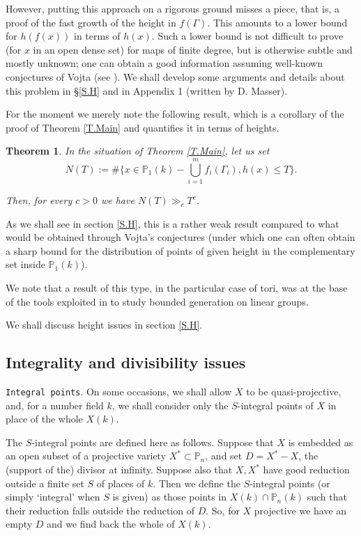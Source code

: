 \documentclass[leqno,12pt]{article} %
\def\P{{{\mathbb P}}}
\theoremstyle{plain} %
\newtheorem{theorem}{\indent\sc Theorem}[section]
\theoremstyle{definition} %
\begin{document}
 However, putting this approach on a rigorous ground misses a piece, that is, a proof of the fast growth of the height in $f(\Gamma)$. This amounts to a lower bound  for $h(f(x))$ in terms of $h(x)$. Such a lower bound is not difficult to prove (for $x$ in an open dense set) for maps of  finite degree, but is otherwise subtle and mostly unknown; one can obtain a good information assuming well-known conjectures of Vojta (see \cite{BG}). 
We shall develop some arguments and details about this problem in \S\ref{S.H} and in   Appendix 1 (written by D. Masser).  


For the moment we merely note the following result, which is a corollary of the proof of  Theorem \ref{T.Main} and quantifies it in terms of heights.

\begin{theorem} \label{T.H1} In the situation of Theorem \ref{T.Main}, let   us  set 
\begin{equation}\label{E.lower-bound}
N(T):=\# \{x\in \P_1(k)-\bigcup_{i=1}^mf_i(\Gamma_i), h(x)\le T\}.
\end{equation}


Then, for every $c>0$ we have  $N(T)\gg_cT^c$. 
\end{theorem} 
As we shall see in section \ref{S.H},  this is a rather weak result compared to what would be obtained through Vojta's conjectures (under which one can often obtain a sharp bound for the distribution of points of given height in the complementary set inside $\P_1(k)$).

We note that a result of this type, in the particular case of tori, was at the base of the tools exploited in \cite{CDRRZ} to study bounded generation on linear groups. 


We shall discuss height issues in  section \ref{S.H}.


\subsection{Integrality and divisibility issues}

{\tt Integral points}. 
On  some occasions,  we shall allow $X$ to be quasi-projective, and, for a number field $k$,  we shall consider only  the $S$-integral points of $X$ in place of the whole $X(k)$.  

The $S$-integral points are  defined here as follows.  Suppose that $X$ is embedded as an open subset of a projective variety $X^*\subset \P_n$, and  set $D=X^*-X$, the (support of the)  divisor at infinity. Suppose also that $X,X^*$ have good reduction outside a finite set $S$ of places of $k$. Then we define the $S$-integral points (or simply `integral' when $S$ is given) as those points in $X (k)\cap \P_n(k)$ such that their reduction falls outside the reduction of $D$. So, for $X$ projective we  have an empty $D$ and we find back the whole of $X(k)$.  
\end{document}
